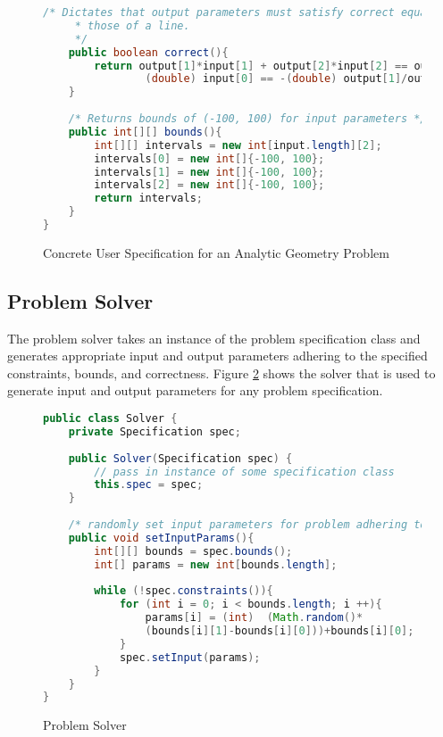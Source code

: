 \begin{singlespace}
\begin{figure}
\begin{lstlisting}[language=Java]
	/* Dictates that output parameters must satisfy correct equations for
	 * those of a line. 
	 */
	public boolean correct(){
		return output[1]*input[1] + output[2]*input[2] == output[0] &&
				(double) input[0] == -(double) output[1]/output[2];
	}
	
	/* Returns bounds of (-100, 100) for input parameters */
	public int[][] bounds(){
		int[][] intervals = new int[input.length][2];
		intervals[0] = new int[]{-100, 100};
		intervals[1] = new int[]{-100, 100};
		intervals[2] = new int[]{-100, 100};
		return intervals;
	}
}
\end{lstlisting}
\caption{Concrete User Specification for an Analytic Geometry Problem}
\label{fig:problem}
\end{figure}

\end{singlespace}

\subsection{Problem Solver}

The problem solver takes an instance of the problem specification class and generates appropriate input and output parameters adhering to the specified constraints, bounds, and correctness. Figure \ref{fig:solver} shows the solver that is used to generate input and output parameters for any problem specification.

\begin{singlespace}

\begin{figure}
\begin{lstlisting}[language=Java]
public class Solver {
	private Specification spec;
	
	public Solver(Specification spec) {
		// pass in instance of some specification class
		this.spec = spec;
	}
	
	/* randomly set input parameters for problem adhering to constraints */
	public void setInputParams(){
		int[][] bounds = spec.bounds();
		int[] params = new int[bounds.length];
		
		while (!spec.constraints()){
			for (int i = 0; i < bounds.length; i ++){
				params[i] = (int)  (Math.random()*
				(bounds[i][1]-bounds[i][0]))+bounds[i][0];
			}
			spec.setInput(params);
		}
	}
}
\end{lstlisting}
\caption{Problem Solver}
\label{fig:solver}
\end{figure}

\end{singlespace}


